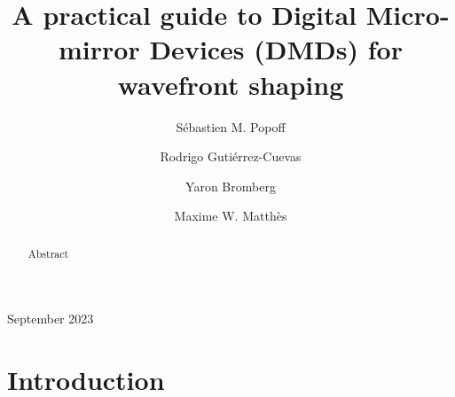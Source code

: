 \documentclass[12pt]{iopart}
\begin{document}
\title{A practical guide to Digital Micro-mirror Devices (DMDs) for wavefront shaping}

\author{Sébastien M. Popoff}
\address{Institut Langevin, ESPCI Paris, PSL University, CNRS, France}

\author{Rodrigo Gutiérrez-Cuevas}
\address{Institut Langevin, ESPCI Paris, PSL University, CNRS, France}

\author{Yaron Bromberg}
\address{Racah Institute of Physics, The Hebrew University of Jerusalem, Israel}

\author{Maxime W. Matthès}
\address{Institut Langevin, ESPCI Paris, PSL University, CNRS, France}

\vspace{10pt}
\begin{indented}
  \item[]September 2023
\end{indented}

\begin{abstract}
  Abstract
\end{abstract}

%
%
%
% 
%

\section{Introduction}
\end{document}
